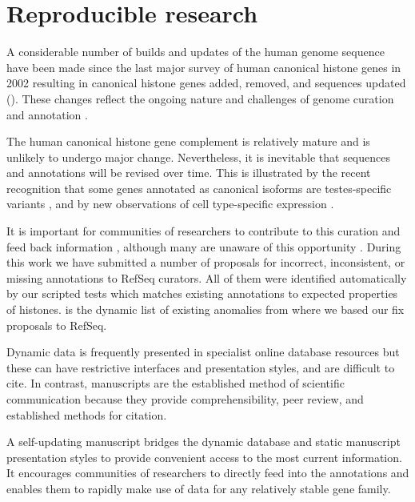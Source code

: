\section{Reproducible research}
\label{sec:reproducible}

  A considerable number of builds and updates of the human genome sequence have been made
  since the last major survey of human canonical histone genes in 2002 \citep{Marzluff02}
  resulting in
  \AddedSinceReference{} canonical histone genes added,
  \RemovedSinceReference{} removed,
  and \SequencesUpdatedSinceReference{}
  sequences updated ().
  These changes reflect the ongoing nature and challenges of
  genome curation and annotation \citep{BorkKoonin1998}.

  The human canonical histone gene complement is relatively mature
  and is unlikely to undergo major change.
  Nevertheless, it is inevitable that sequences and annotations will be revised over time.
  This is illustrated by the recent recognition that
  some genes annotated as canonical isoforms are testes-specific variants \citep{Talbert2012},
  and by new observations of cell type-specific expression \citep{Molden2015}.

  It is important for communities of researchers to contribute
  to this curation and feed back information \citep{SteinNRG2001},
  although many are unaware of this opportunity \citep{HollidaySPR2015}.
  During this work we have submitted a number
  of proposals for incorrect, inconsistent, or missing annotations
  to RefSeq curators.  All of them were identified automatically
  by our scripted tests which matches existing
  annotations to expected properties of histones.
   is the dynamic list of existing
  anomalies from where we based our fix proposals to RefSeq.

  Dynamic data is frequently presented in specialist online database resources
  but these can have restrictive interfaces and presentation styles, and are difficult to cite.
  In contrast, manuscripts are the established method of scientific communication
  because they provide comprehensibility, peer review, and established methods for citation.

  A self-updating manuscript bridges the dynamic database and static manuscript
  presentation styles to provide convenient access to the most current information.
  It encourages communities of researchers to directly feed into the annotations
  and enables them to rapidly make use of data for any relatively stable gene family.


